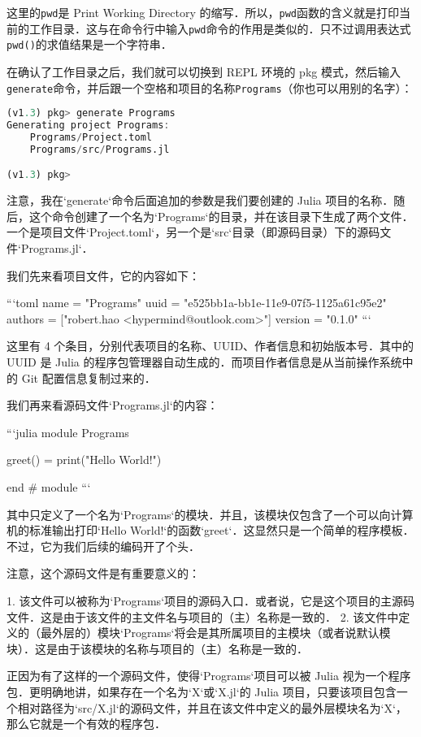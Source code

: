 这里的\verb|pwd|是 Print Working Directory 的缩写．所以，\verb|pwd|函数的含义就是打印当前的工作目录．这与在命令行中输入\verb|pwd|命令的作用是类似的．只不过调用表达式\verb|pwd()|的求值结果是一个字符串．

在确认了工作目录之后，我们就可以切换到 REPL 环境的 pkg 模式，然后输入\verb|generate|命令，并后跟一个空格和项目的名称\verb|Programs|（你也可以用别的名字）：

\begin{lstlisting}[language=julia]
(v1.3) pkg> generate Programs
Generating project Programs:
    Programs/Project.toml
    Programs/src/Programs.jl

(v1.3) pkg> 
\end{lstlisting}

注意，我在`generate`命令后面追加的参数是我们要创建的 Julia 项目的名称．随后，这个命令创建了一个名为`Programs`的目录，并在该目录下生成了两个文件．一个是项目文件`Project.toml`，另一个是`src`目录（即源码目录）下的源码文件`Programs.jl`．

我们先来看项目文件，它的内容如下：

```toml
name = "Programs"
uuid = "e525bb1a-bb1e-11e9-07f5-1125a61c95e2"
authors = ["robert.hao <hypermind@outlook.com>"]
version = "0.1.0"
```

这里有 4 个条目，分别代表项目的名称、UUID、作者信息和初始版本号．其中的 UUID 是 Julia 的程序包管理器自动生成的．而项目作者信息是从当前操作系统中的 Git 配置信息复制过来的．

我们再来看源码文件`Programs.jl`的内容：

```julia
module Programs

greet() = print("Hello World!")

end # module
```

其中只定义了一个名为`Programs`的模块．并且，该模块仅包含了一个可以向计算机的标准输出打印`Hello World!`的函数`greet`．这显然只是一个简单的程序模板．不过，它为我们后续的编码开了个头．

注意，这个源码文件是有重要意义的：

1. 该文件可以被称为`Programs`项目的源码入口．或者说，它是这个项目的主源码文件．这是由于该文件的主文件名与项目的（主）名称是一致的．
2. 该文件中定义的（最外层的）模块`Programs`将会是其所属项目的主模块（或者说默认模块）．这是由于该模块的名称与项目的（主）名称是一致的．

正因为有了这样的一个源码文件，使得`Programs`项目可以被 Julia 视为一个程序包．更明确地讲，如果存在一个名为`X`或`X.jl`的 Julia 项目，只要该项目包含一个相对路径为`src/X.jl`的源码文件，并且在该文件中定义的最外层模块名为`X`，那么它就是一个有效的程序包．

